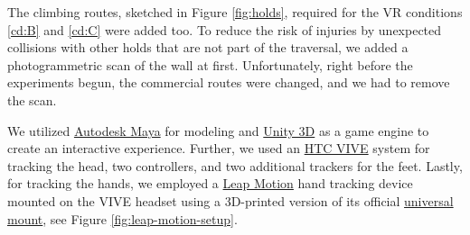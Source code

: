 The climbing routes, sketched in Figure \vref{fig:holds}, required for the \gls{VR} conditions \ref{cd:B} and \ref{cd:C} were added too. To reduce the risk of injuries by unexpected collisions with other holds that are not part of the traversal, we added a photogrammetric scan of the wall at first. Unfortunately, right before the experiments begun, the commercial routes were changed, and we had to remove the scan.

We utilized \href{https://www.autodesk.com/products/maya/overview}{Autodesk Maya} for modeling and \href{https://unity3d.com/}{Unity 3D} as a game engine to create an interactive experience. Further, we used an \href{https://www.vive.com/}{HTC VIVE} system for tracking the head, two controllers, and two additional trackers for the feet. Lastly, for tracking the hands, we employed a \href{https://www.leapmotion.com/}{Leap Motion} hand tracking device mounted on the VIVE headset using a 3D-printed version of its official \href{https://store-us.leapmotion.com/products/universal-vr-mount-pre-order}{universal mount}, see Figure \ref{fig:leap-motion-setup}.


